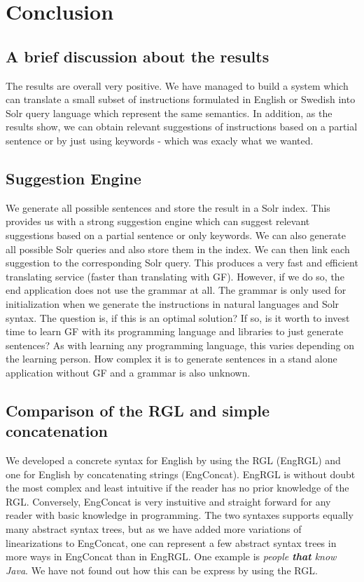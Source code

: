 \chapter{Conclusion}\label{ch:conclusion}
\section{A brief discussion about the results}
The results are overall very positive. We have managed to build a system which can translate a small subset of instructions formulated in English or Swedish into Solr query language which represent the same semantics. In addition, as the results show, we can obtain relevant suggestions of instructions based on a partial sentence or by just using keywords - which was exacly what we wanted.

\section{Suggestion Engine}
We generate all possible sentences and store the result in a Solr index. This provides us with a strong suggestion engine which can suggest relevant suggestions based on a partial sentence or only keywords. We can also generate all possible Solr queries and also store them in the index. We can then link each suggestion to the corresponding Solr query. This produces a very fast and efficient translating service (faster than translating with GF). However, if we do so, the end application does not use the grammar at all. The grammar is only used for initialization when we generate the instructions in natural languages and Solr syntax. The question is, if this is an optimal solution? If so, is it worth to invest time to learn GF with its programming language and libraries to just generate sentences? As with learning any programming language, this varies depending on the learning person. How complex it is to generate sentences in a stand alone application without GF and a grammar is also unknown.

\section{Comparison of the RGL and simple concatenation}\label{sec:comparison}
We developed a concrete syntax for English by using the RGL (EngRGL) and one for English by concatenating strings (EngConcat). EngRGL is without doubt the most complex and least intuitive if the reader has no prior knowledge of the RGL. Conversely, EngConcat is very instuitive and straight forward for any reader with basic knowledge in programming. The two syntaxes supports equally many abstract syntax trees, but as we have added more variations of linearizations to EngConcat, one can represent a few abstract syntax trees in more ways in EngConcat than in EngRGL. One example is \emph{people \textbf{that} know Java}. We have not found out how this can be express by using the RGL.

